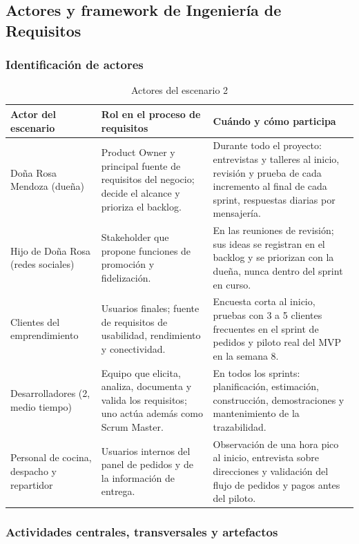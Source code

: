 \documentclass[12pt,a4paper]{article}
\begin{document}
\subsection{Actores y framework de Ingeniería de Requisitos}

\subsubsection{Identificación de actores}

\begin{table}[H]
\centering
\caption{Actores del escenario 2}
\small
\begin{tabularx}{\textwidth}{
    >{\raggedright\arraybackslash}p{2.8cm} Y Y
}
\toprule
\textbf{Actor del escenario} &
\textbf{Rol en el proceso de requisitos} &
\textbf{Cuándo y cómo participa} \\
\midrule
Doña Rosa Mendoza (dueña) & Product Owner y principal fuente de requisitos del negocio; decide el alcance y prioriza el backlog. & Durante todo el proyecto: entrevistas y talleres al inicio, revisión y prueba de cada incremento al final de cada sprint, respuestas diarias por mensajería. \\
\midrule
Hijo de Doña Rosa (redes sociales) & Stakeholder que propone funciones de promoción y fidelización. & En las reuniones de revisión; sus ideas se registran en el backlog y se priorizan con la dueña, nunca dentro del sprint en curso. \\
\midrule
Clientes del emprendimiento & Usuarios finales; fuente de requisitos de usabilidad, rendimiento y conectividad. & Encuesta corta al inicio, pruebas con 3 a 5 clientes frecuentes en el sprint de pedidos y piloto real del MVP en la semana 8. \\
\midrule
Desarrolladores (2, medio tiempo) & Equipo que elicita, analiza, documenta y valida los requisitos; uno actúa además como Scrum Master. & En todos los sprints: planificación, estimación, construcción, demostraciones y mantenimiento de la trazabilidad. \\
\midrule
Personal de cocina, despacho y repartidor & Usuarios internos del panel de pedidos y de la información de entrega. & Observación de una hora pico al inicio, entrevista sobre direcciones y validación del flujo de pedidos y pagos antes del piloto. \\
\bottomrule
\end{tabularx}
\end{table}

\subsubsection{Actividades centrales, transversales y artefactos}
\end{document}
